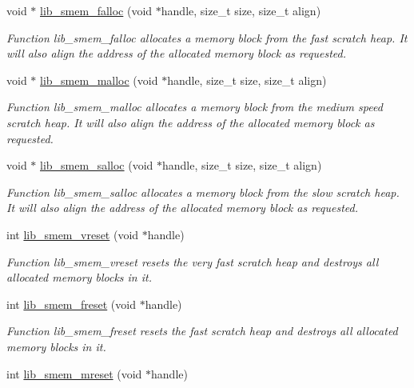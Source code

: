 \begin{DoxyCompactItemize}
void $\ast$ \hyperlink{group__libarch__memmgt_ga51d763b1f89ef58e83cb9e4bc7546ba8}{lib\+\_\+smem\+\_\+falloc} (void $\ast$handle, size\+\_\+t size, size\+\_\+t align)
\begin{DoxyCompactList}\small\item\em Function lib\+\_\+smem\+\_\+falloc allocates a memory block from the fast scratch heap. It will also align the address of the allocated memory block as requested. \end{DoxyCompactList}\item 
void $\ast$ \hyperlink{group__libarch__memmgt_gaac0047f2fe5ce1dfad45fc0333d906dc}{lib\+\_\+smem\+\_\+malloc} (void $\ast$handle, size\+\_\+t size, size\+\_\+t align)
\begin{DoxyCompactList}\small\item\em Function lib\+\_\+smem\+\_\+malloc allocates a memory block from the medium speed scratch heap. It will also align the address of the allocated memory block as requested. \end{DoxyCompactList}\item 
void $\ast$ \hyperlink{group__libarch__memmgt_ga08b73e8bf61fb50e20e08f7df4de636b}{lib\+\_\+smem\+\_\+salloc} (void $\ast$handle, size\+\_\+t size, size\+\_\+t align)
\begin{DoxyCompactList}\small\item\em Function lib\+\_\+smem\+\_\+salloc allocates a memory block from the slow scratch heap. It will also align the address of the allocated memory block as requested. \end{DoxyCompactList}\item 
int \hyperlink{group__libarch__memmgt_ga65c30f7a20c6e359df9d73db0c9078c1}{lib\+\_\+smem\+\_\+vreset} (void $\ast$handle)
\begin{DoxyCompactList}\small\item\em Function lib\+\_\+smem\+\_\+vreset resets the very fast scratch heap and destroys all allocated memory blocks in it. \end{DoxyCompactList}\item 
int \hyperlink{group__libarch__memmgt_ga18470bba549f0d9c4a6d98a1f615b8c2}{lib\+\_\+smem\+\_\+freset} (void $\ast$handle)
\begin{DoxyCompactList}\small\item\em Function lib\+\_\+smem\+\_\+freset resets the fast scratch heap and destroys all allocated memory blocks in it. \end{DoxyCompactList}\item 
int \hyperlink{group__libarch__memmgt_ga38dbf46a5af66e691ba20ffb61f9932e}{lib\+\_\+smem\+\_\+mreset} (void $\ast$handle)

\end{DoxyCompactItemize}
